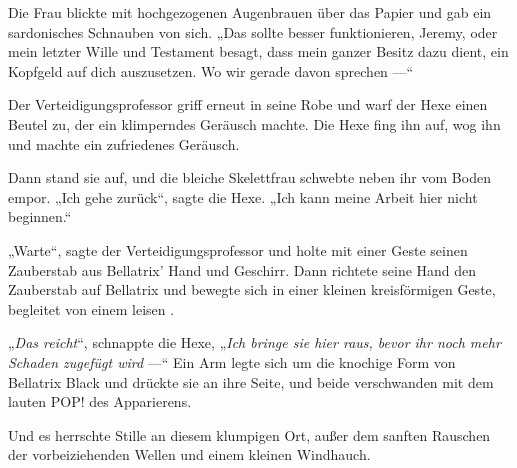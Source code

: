Die Frau blickte mit hochgezogenen Augenbrauen über das Papier und gab ein sardonisches Schnauben von sich.
„Das sollte besser funktionieren, Jeremy, oder mein letzter Wille und Testament besagt, dass mein ganzer Besitz dazu dient, ein Kopfgeld auf dich auszusetzen. Wo wir gerade davon sprechen —“

Der Verteidigungsprofessor griff erneut in seine Robe und warf der Hexe einen Beutel zu, der ein klimperndes Geräusch machte. Die Hexe fing ihn auf, wog ihn und machte ein zufriedenes Geräusch.

Dann stand sie auf, und die bleiche Skelettfrau schwebte neben ihr vom Boden empor.
„Ich gehe zurück“, sagte die Hexe.
„Ich kann meine Arbeit hier nicht beginnen.“

„Warte“, sagte der Verteidigungsprofessor und holte mit einer Geste seinen Zauberstab aus Bellatrix’ Hand und Geschirr. Dann richtete seine Hand den Zauberstab auf Bellatrix und bewegte sich in einer kleinen kreisförmigen Geste, begleitet von einem leisen .

„\emph{Das reicht}“, schnappte die Hexe,
„\emph{Ich bringe sie hier raus, bevor ihr noch mehr Schaden zugefügt wird} —“ Ein Arm legte sich um die knochige Form von Bellatrix Black und drückte sie an ihre Seite, und beide verschwanden mit dem lauten POP! des Apparierens.

Und es herrschte Stille an diesem klumpigen Ort, außer dem sanften Rauschen der vorbeiziehenden Wellen und einem kleinen Windhauch.

